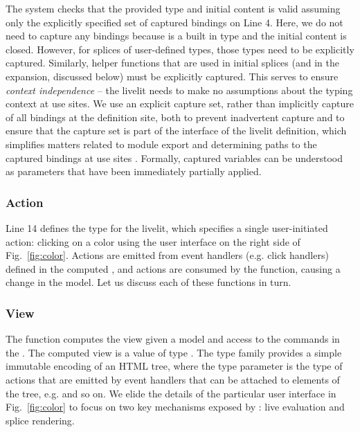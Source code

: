 The system checks that the provided type and initial content is valid 
assuming only the explicitly specified set of captured bindings on Line 4.
Here, we do not need to capture any bindings because  is a built in type
and the initial content is closed. However, 
for splices of user-defined types, those types need to be explicitly captured.
Similarly, helper functions that are used in initial splices (and in the expansion,
discussed below) must be explicitly captured. 
This serves to ensure \emph{context independence} -- the livelit needs to make no 
assumptions about the typing context at use sites.
We use an explicit capture set, rather than implicitly capture of all bindings at the definition site, 
both to prevent inadvertent capture 
and to ensure that the capture set is part
of the interface of the livelit definition, which simplifies matters related to 
module export and determining paths to the captured bindings at use sites \cite{TLMs}.
Formally, captured variables can be understood as parameters that have been 
immediately partially applied.

\subsubsection{Action}
Line 14 defines the  type for the  livelit, which 
specifies a single user-initiated action: clicking on a color using the user 
interface on the right side of Fig.~\ref{fig:color}. Actions are emitted
from event handlers (e.g. click handlers) defined in the computed , 
and actions are consumed by the  function, causing a change in the model. 
Let us discuss each of these functions in turn.

\subsubsection{View}
The  function computes the view given a model and access to the commands in 
the . The computed view is a value of type .  
The type family  provides a simple immutable
encoding of an HTML tree, where the type parameter  is the type of actions that 
are emitted by event handlers that can be attached to elements of the tree, e.g.
 and so on. 
We elide the details of the particular user interface in Fig.~\ref{fig:color}
to focus on two key mechanisms exposed by : live evaluation 
and splice rendering.

